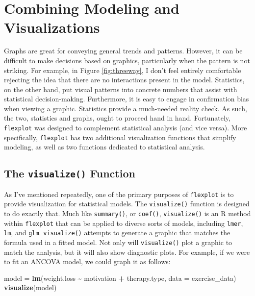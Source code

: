\documentclass[
  english,
  man]{apa6}
\newenvironment{Shaded}{\begin{snugshade}}{\end{snugshade}}
\newcommand{\DataTypeTok}[1]{\textcolor[rgb]{0.13,0.29,0.53}{#1}}
\newcommand{\KeywordTok}[1]{\textcolor[rgb]{0.13,0.29,0.53}{\textbf{#1}}}
\newcommand{\NormalTok}[1]{#1}
\newcommand{\OperatorTok}[1]{\textcolor[rgb]{0.81,0.36,0.00}{\textbf{#1}}}
\newcommand{\StringTok}[1]{\textcolor[rgb]{0.31,0.60,0.02}{#1}}
\begin{document}
\normalsize

\hypertarget{combining-modeling-and-visualizations}{%
\section{Combining Modeling and Visualizations}\label{combining-modeling-and-visualizations}}

Graphs are great for conveying general trends and patterns. However, it can be difficult to make decisions based on graphics, particularly when the pattern is not striking. For example, in Figure \ref{fig:threeway}, I don't feel entirely comfortable rejecting the idea that there are no interactions present in the model. Statistics, on the other hand, put visual patterns into concrete numbers that assist with statistical decision-making. Furthermore, it is easy to engage in confirmation bias when viewing a graphic. Statistics provide a much-needed reality check. As such, the two, statistics and graphs, ought to proceed hand in hand. Fortunately, \texttt{flexplot} was designed to complement statistical analysis (and vice versa). More specifically, \texttt{flexplot} has two additional visualization functions that simplify modeling, as well as two functions dedicated to statistical analysis.

\hypertarget{the-visualize-function}{%
\subsection{\texorpdfstring{The \texttt{visualize()} Function}{The visualize() Function}}\label{the-visualize-function}}

As I've mentioned repeatedly, one of the primary purposes of \texttt{flexplot} is to provide visualization for statistical models. The \texttt{visualize()} function is designed to do exactly that. Much like \texttt{summary()}, or \texttt{coef()}, \texttt{visualize()} is an R method within \texttt{flexplot} that can be applied to diverse sorts of models, including \texttt{lmer}, \texttt{lm}, and \texttt{glm}. \texttt{visualize()} attempts to generate a graphic that matches the formula used in a fitted model. Not only will \texttt{visualize()} plot a graphic to match the analysis, but it will also show diagnostic plots. For example, if we were to fit an ANCOVA model, we could graph it as follows:

\small

\begin{Shaded}
\begin{Highlighting}[]
\NormalTok{model =}\StringTok{ }\KeywordTok{lm}\NormalTok{(weight.loss }\OperatorTok{\textasciitilde{}}\StringTok{ }\NormalTok{motivation }\OperatorTok{+}\StringTok{ }\NormalTok{therapy.type, }
           \DataTypeTok{data =}\NormalTok{ exercise\_data)}
\KeywordTok{visualize}\NormalTok{(model)}
\end{Highlighting}
\end{Shaded}
\end{document}
